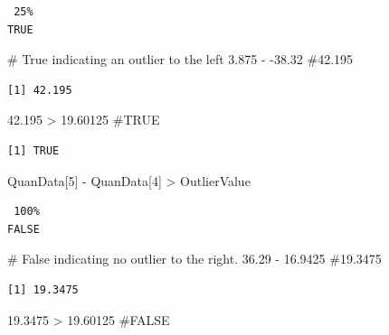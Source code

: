 \documentclass[
  letterpaper,
  DIV=11,
  numbers=noendperiod]{scrreprt}
\newenvironment{Shaded}{\begin{snugshade}}{\end{snugshade}}
\newcommand{\CommentTok}[1]{\textcolor[rgb]{0.37,0.37,0.37}{#1}}
\newcommand{\DecValTok}[1]{\textcolor[rgb]{0.68,0.00,0.00}{#1}}
\newcommand{\FloatTok}[1]{\textcolor[rgb]{0.68,0.00,0.00}{#1}}
\newcommand{\NormalTok}[1]{\textcolor[rgb]{0.00,0.23,0.31}{#1}}
\newcommand{\SpecialCharTok}[1]{\textcolor[rgb]{0.37,0.37,0.37}{#1}}
\begin{document}
\begin{verbatim}
 25% 
TRUE 
\end{verbatim}

\begin{Shaded}
\begin{Highlighting}[]
\CommentTok{\# True indicating an outlier to the left}
\FloatTok{3.875} \SpecialCharTok{{-}} \SpecialCharTok{{-}}\FloatTok{38.32}  \CommentTok{\#42.195}
\end{Highlighting}
\end{Shaded}

\begin{verbatim}
[1] 42.195
\end{verbatim}

\begin{Shaded}
\begin{Highlighting}[]
\FloatTok{42.195} \SpecialCharTok{\textgreater{}} \FloatTok{19.60125}  \CommentTok{\#TRUE}
\end{Highlighting}
\end{Shaded}

\begin{verbatim}
[1] TRUE
\end{verbatim}

\begin{Shaded}
\begin{Highlighting}[]
\NormalTok{QuanData[}\DecValTok{5}\NormalTok{] }\SpecialCharTok{{-}}\NormalTok{ QuanData[}\DecValTok{4}\NormalTok{] }\SpecialCharTok{\textgreater{}}\NormalTok{ OutlierValue}
\end{Highlighting}
\end{Shaded}

\begin{verbatim}
 100% 
FALSE 
\end{verbatim}

\begin{Shaded}
\begin{Highlighting}[]
\CommentTok{\# False indicating no outlier to the right.}
\FloatTok{36.29} \SpecialCharTok{{-}} \FloatTok{16.9425}  \CommentTok{\#19.3475}
\end{Highlighting}
\end{Shaded}

\begin{verbatim}
[1] 19.3475
\end{verbatim}

\begin{Shaded}
\begin{Highlighting}[]
\FloatTok{19.3475} \SpecialCharTok{\textgreater{}} \FloatTok{19.60125}  \CommentTok{\#FALSE }
\end{Highlighting}
\end{Shaded}
\end{document}
